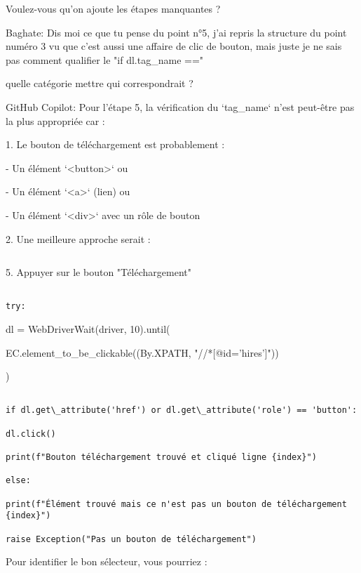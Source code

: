 Voulez-vous qu'on ajoute les étapes manquantes ?

Baghate: Dis moi ce que tu pense du point n°5, j'ai repris la structure du point numéro 3 vu que c'est aussi une affaire de clic de bouton, mais juste je ne sais pas comment qualifier le "if dl.tag\_name =="

quelle catégorie mettre qui correspondrait ?

GitHub Copilot: Pour l'étape 5, la vérification du `tag\_name` n'est peut-être pas la plus appropriée car :

1. Le bouton de téléchargement est probablement :

- Un élément `<button>` ou

- Un élément `<a>` (lien) ou

- Un élément `<div>` avec un rôle de bouton

2. Une meilleure approche serait :

\begin{verbatim}

\end{verbatim}

  5. Appuyer sur le bouton "Téléchargement"

\begin{verbatim}

try:

\end{verbatim}

dl = WebDriverWait(driver, 10).until(

EC.element\_to\_be\_clickable((By.XPATH, "//*[@id='hires']"))

)

\begin{verbatim}

if dl.get\_attribute('href') or dl.get\_attribute('role') == 'button':

dl.click()

print(f"Bouton téléchargement trouvé et cliqué ligne {index}")

else:

print(f"Élément trouvé mais ce n'est pas un bouton de téléchargement {index}")

raise Exception("Pas un bouton de téléchargement")

\end{verbatim}

Pour identifier le bon sélecteur, vous pourriez :

